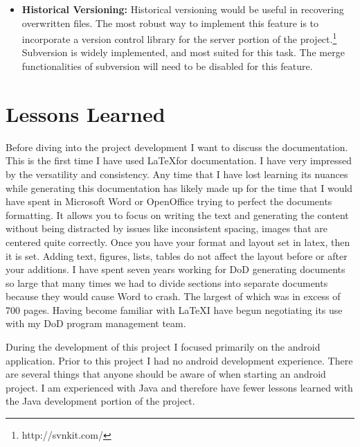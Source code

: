 \documentclass[12pt]{article}
\begin{document}
\begin{itemize}
\item \textbf{Historical Versioning:} Historical versioning would be useful in recovering overwritten files.  The most robust way to implement this feature is to incorporate a version control library for the server portion of the project.\footnote{http://svnkit.com/} Subversion is widely implemented, and most suited for this task. The merge functionalities of subversion will need to be disabled for this feature.
\end{itemize}

\section{Lessons Learned}

Before diving into the project development I want to discuss the documentation. This is the first time I have used \LaTeX  for documentation. I have very impressed by the versatility and consistency. Any time that I have lost learning its nuances while generating this documentation has likely made up for the time that I would have spent in Microsoft Word or OpenOffice trying to perfect the documents formatting.  It allows you to focus on writing the text and generating the content without being distracted by issues like inconsistent spacing, images that are centered quite correctly. Once you have your format and layout set in latex, then it is set. Adding text, figures, lists, tables do not affect the layout before or after your additions. I have spent seven years working for DoD generating documents so large that many times we had to divide sections into separate documents because they would cause Word to crash. The largest of which was in excess of 700 pages. Having become familiar with \LaTeX  I have begun negotiating its use with my DoD program management team. 

During the development of this project I focused primarily on the android application. Prior to this project I had no android development experience. There are several things that anyone should be aware of when starting an android project.  I am experienced with Java and therefore have fewer lessons learned with the Java development portion of the project.
\end{document}
